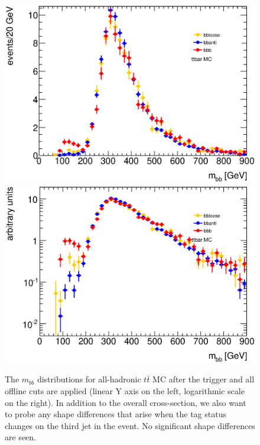 \begin{figure}[hbt]
\includegraphics[width=0.45\linewidth]{BackgroundEstimation/images/mbb_compare_bbb_bbloose_bbanti_ttbar.eps}
\includegraphics[width=0.45\linewidth]{BackgroundEstimation/images/mbb_compare_bbb_bbloose_bbanti_ttbar_logy.eps}
\caption{The $m_{bb}$ distributions for all-hadronic $t\bar{t}$ MC after the trigger and all offline cuts are applied (linear Y axis on the left, logarithmic scale on the right).  In addition to the overall cross-section, we also want to probe any shape differences that arise when the tag status changes on the third jet in the event.  No significant shape differences are seen.}
\label{fig:ttbar_mbb}
\end{figure}







%
%




